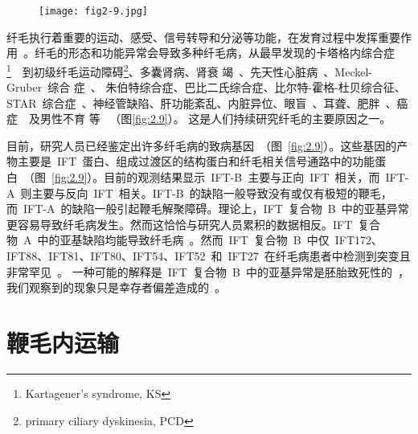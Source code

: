 \begin{figure}[htb!]
\centering
\graphicspath{{figures/}}
\texttt{[image: fig2-9.jpg]}
{
\par}
\end{figure}

纤毛执行着重要的运动、感受、信号转导和分泌等功能，在发育过程中发挥重要作用\
\citep{Bodle2013,Huangfu2003,Warner2013,Corbit2005,Diener2015}。纤毛的形态和功能异常会导致多种纤毛病，从最早发现的卡塔格内综合症\footnote{Kartagener's syndrome, KS}\ \citep{Afzelius1976}\ 到初级纤毛运动障碍\footnote{primary ciliary dyskinesia, PCD}、多囊肾病、肾衰
竭\ \citep{Bizet2015}、先天性心脏病\ \citep{Narasimhan2015}、Meckel-Gruber\ 综合
症\ \citep{Dowdle2011,Shaheen2011}、 朱伯特综合症、巴比二氏综合症、比尔特-霍格-杜贝综合征、STAR\ 综合症\ \citep{Guen2016}、神经管缺陷、肝功能紊乱、内脏异位、眼盲\
\citep{Bifari2015}、耳聋、肥胖\ \citep{Mukhopadhyay2013,Omori2015}、癌
症\ \citep{Seeger-Nukpezah2013}\ 及男性不育
等\ \citep{Tobin2009,Cardenas-Rodriguez2013,Luijten2013,Hildebrandt2011,Hildebrandt2007} （图\ref{fig:2.9}）。 这是人们持续研究纤毛的主要原因之一。

目前，研究人员已经鉴定出许多纤毛病的致病基因\ \citep{Wheway2015}（图\ \ref{fig:2.9}）。这些基因的产物主要是\ IFT\ 蛋白、组成过渡区的结构蛋白和纤毛相关信号通路中的功能蛋白\
\citep{Czarnecki2012,Wheway2015,Bifari2015,Duran2017}（图\ \ref{fig:2.9}）。目前的观测结果显示\ IFT-B\ 主要与正向\ IFT\ 相关，而\ IFT-A\ 则主要与反向\ IFT\ 相关。IFT-B\ 的缺陷一般导致没有或仅有极短的鞭毛，而\ IFT-A\ 的缺陷一般引起鞭毛解聚障碍。理论上，IFT\ 复合物\ B\ 中的亚基异常更容易导致纤毛病发生。然而这恰恰与研究人员累积的数据相反。IFT\ 复合物\ A\ 中的亚基缺陷均能导致纤毛病\ \citep{Perrault2015,Duran2017}。然而\ IFT\ 复合物\ B\ 中仅\ IFT172、IFT88、IFT81、IFT80、IFT54、IFT52\ 和\ IFT27\ 在纤毛病患者中检测到突变且
非常罕见\ \citep{Bizet2015,Perrault2015,Bifari2015,Zhang2016}。 一种可能的解释是\ IFT\ 复合物\ B\ 中的亚基异常是胚胎致死性的\ \citep{Perrault2015}，我们观察到的现象只是幸存者偏差造成的\
\citep{Mangel1984}。

\section{鞭毛内运输}
